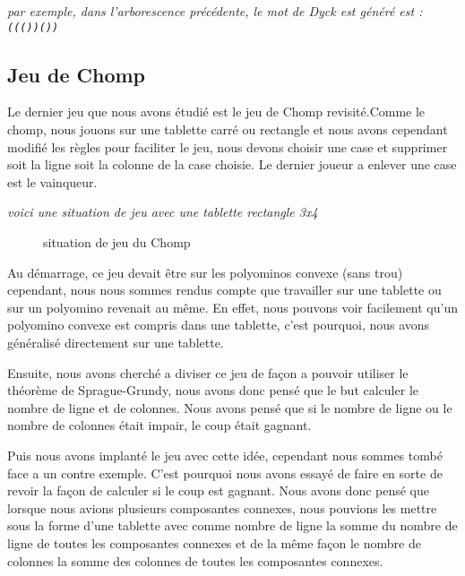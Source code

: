   \textit{par exemple, dans l'arborescence précédente, le mot de Dyck est généré est : \texttt{((())())}}

\subsection{Jeu de Chomp}
\label{sub:Jeu de Chomp}

Le dernier jeu que nous avons étudié est le jeu de Chomp revisité.Comme le chomp, nous jouons sur une tablette carré ou rectangle et nous avons cependant modifié les règles pour faciliter le jeu, nous devons choisir une case et supprimer soit la ligne soit la colonne de la case choisie. Le dernier joueur a enlever une case est le vainqueur.

\textit{
  voici une situation de jeu avec une tablette rectangle 3x4
}

\begin{figure}[h]
  \centering
  \caption{situation de jeu du Chomp}
 
\end{figure}
Au démarrage, ce jeu devait être sur les polyominos convexe (sans trou) cependant, nous nous sommes rendus compte que travailler sur une tablette ou sur un polyomino revenait au même. En effet, nous pouvons voir facilement qu'un polyomino convexe est compris dans une tablette, c'est pourquoi, nous avons généralisé directement sur une tablette.

Ensuite, nous avons cherché a diviser ce jeu de façon a pouvoir utiliser le théorème de Sprague-Grundy, nous avons donc pensé que le but calculer le nombre de ligne et de colonnes. Nous avons pensé que si le nombre de ligne ou le nombre de colonnes était impair, le coup était gagnant.

Puis nous avons implanté le jeu avec cette idée, cependant nous sommes tombé face a un contre exemple. C'est pourquoi nous avons essayé de faire en sorte de revoir la façon de calculer si le coup est gagnant. Nous avons donc pensé que lorsque nous avions plusieurs composantes connexes, nous pouvions les mettre sous la forme d'une tablette avec comme nombre de ligne la somme du nombre de ligne de toutes les composantes connexes et de la même façon le nombre de colonnes la somme des colonnes de toutes les composantes connexes.

